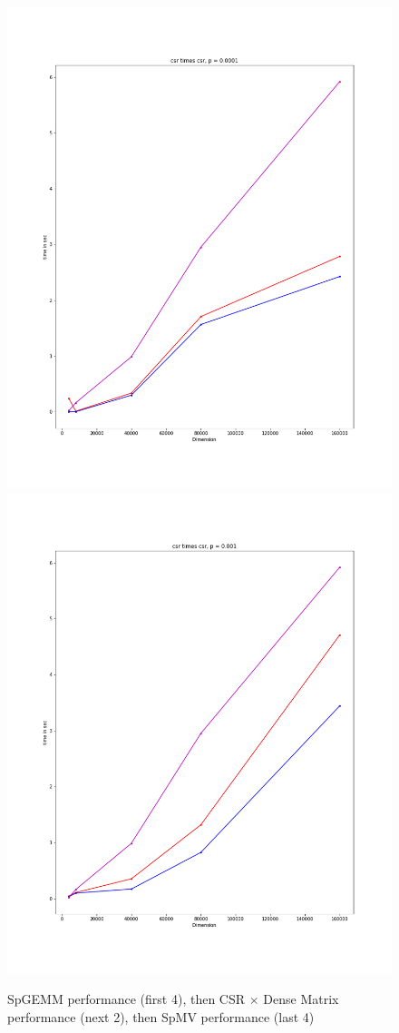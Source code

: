 \documentclass[12pt]{article}
\begin{document}
\begin{figure}[h]
  \caption{SpGEMM performance (first 4), then CSR $\times$ Dense Matrix performance (next 2), then SpMV performance (last 4) }
  \includegraphics[scale = 0.16]{csr_csr_0001.PNG}
  \includegraphics[scale = 0.16]{csr_csr_001.PNG}

\end{figure}
\end{document}
